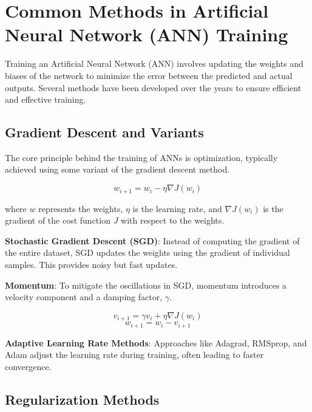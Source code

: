 \documentclass{article}
\begin{document}
\section*{Common Methods in Artificial Neural Network (ANN) Training}

Training an Artificial Neural Network (ANN) involves updating the weights and biases of the network to minimize the error between the predicted and actual outputs. Several methods have been developed over the years to ensure efficient and effective training. 

\subsection*{Gradient Descent and Variants}

The core principle behind the training of ANNs is optimization, typically achieved using some variant of the gradient descent method.

\begin{equation}
w_{i+1} = w_i - \eta \nabla J(w_i)
\end{equation}

where \( w \) represents the weights, \( \eta \) is the learning rate, and \( \nabla J(w_i) \) is the gradient of the cost function \( J \) with respect to the weights.

\noindent \textbf{Stochastic Gradient Descent (SGD)}:
Instead of computing the gradient of the entire dataset, SGD updates the weights using the gradient of individual samples. This provides noisy but fast updates.

\noindent \textbf{Momentum}:
To mitigate the oscillations in SGD, momentum introduces a velocity component and a damping factor, \(\gamma\).

\begin{equation}
v_{i+1} = \gamma v_i + \eta \nabla J(w_i)
\end{equation}
\begin{equation}
w_{i+1} = w_i - v_{i+1}
\end{equation}

\noindent \textbf{Adaptive Learning Rate Methods}: 
Approaches like Adagrad, RMSprop, and Adam adjust the learning rate during training, often leading to faster convergence.

\subsection*{Regularization Methods}
\end{document}
